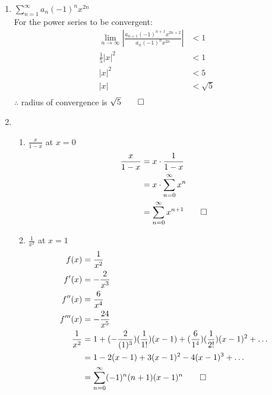 \documentclass[12pt, a4paper]{article}
\begin{document}
\begin{enumerate}[Q\arabic*.]
  \item $\displaystyle \sum^{\infty}_{n=1} a_n(-1)^nx^{2n}$\\
    For the power series to be convergent:
    \begin{align*}
      \lim_{n\rightarrow\infty}|\frac{a_{n+1}(-1)^{n+1}x^{2n+2}}{a_n(-1)^nx^{2n}}| &< 1\\
      \frac{1}{5}|x|^2 &< 1\\
      |x|^2 &< 5\\
      |x| &< \sqrt{5}\\
    \end{align*}
    $\therefore$ radius of convergence is $\sqrt{5} \qed$

  \item 
    \begin{enumerate}[(\alph*)]
      \item $\displaystyle \frac{x}{1-x}$ at $x=0$
        \begin{align*}
          \frac{x}{1-x} &= x \cdot \frac{1}{1-x}\\
                        &= x \cdot \sum^{\infty}_{n=0}x^n\\
                        &= \sum^{\infty}_{n=0}x^{n+1} \qed
        \end{align*}

      \item $\displaystyle \frac{1}{x^2}$ at $x=1$
        \begin{align*}
          f(x) &= \frac{1}{x^2}\\
          f'(x) &= -\frac{2}{x^3}\\
          f''(x) &= \frac{6}{x^4}\\
          f'''(x) &= -\frac{24}{x^5}\\
          \frac{1}{x^2} &= 1 + (-\frac{2}{(1)^3})(\frac{1}{1!})(x-1) + (\frac{6}{1^4})(\frac{1}{2!})(x-1)^2 + \ldots\\
                        &= 1 -2(x-1) + 3(x-1)^2 -4(x-1)^3 +\ldots\\
                        &= \sum^{\infty}_{n=0} (-1)^n(n+1)(x-1)^n \qed
        \end{align*}


\end{enumerate}
\end{enumerate}
\end{document}
